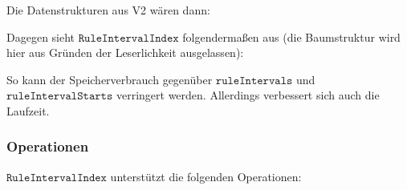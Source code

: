 Die Datenstrukturen aus V2 wären dann:

\begin{figure}[H]
	\centering
	
	\quad
\end{figure}

Dagegen sieht $\texttt{RuleIntervalIndex}$ folgendermaßen aus (die Baumstruktur wird hier aus Gründen der Leserlichkeit ausgelassen):

\begin{figure}[H]
	\centering
	
\end{figure}

So kann der Speicherverbrauch gegenüber $\texttt{ruleIntervals}$ und $\texttt{ruleIntervalStarts}$ verringert werden. Allerdings verbessert sich auch die Laufzeit.

\subsubsection{Operationen}

$\texttt{RuleIntervalIndex}$ unterstützt die folgenden Operationen:

